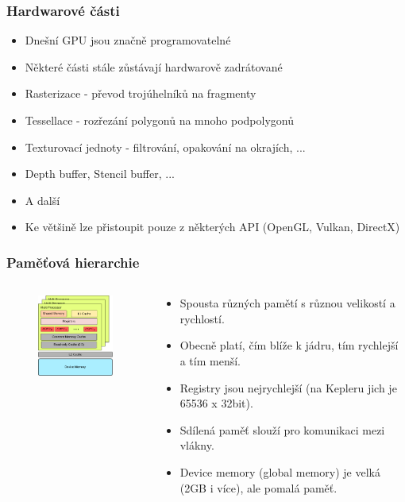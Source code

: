 \begin{frame}
\frametitle{Hardwarové části}
	\begin{itemize}
	\item Dnešní GPU jsou značně programovatelné
  \item Některé části stále zůstávají hardwarově zadrátované
  \item Rasterizace - převod trojúhelníků na fragmenty
  \item Tessellace - rozřezání polygonů na mnoho podpolygonů
  \item Texturovací jednoty - filtrování, opakování na okrajích, ...
  \item Depth buffer, Stencil buffer, ...
  \item A další
  \item Ke většině lze přistoupit pouze z některých API (OpenGL, Vulkan, DirectX)
	\end{itemize}
\end{frame}

\begin{frame}
  \frametitle{Paměťová hierarchie}
  \begin{columns}[T]
    \begin{column}{.48\textwidth}
      \begin{figure}[h]
        \includegraphics[width=5cm,keepaspectratio]{pics/gpu/memory_hierarchy}
      \end{figure}
    \end{column}
    \begin{column}{.48\textwidth}
      \begin{itemize}
        \item Spousta různých pamětí s různou velikostí a rychlostí.
        \item Obecně platí, čím blíže k jádru, tím rychlejší a tím menší.
        \item Registry jsou nejrychlejší (na Kepleru jich je 65536 x 32bit).
        \item Sdílená paměť slouží pro komunikaci mezi vlákny.
        \item Device memory (global memory) je velká (2GB i více), ale pomalá paměť.
      \end{itemize}
    \end{column}
  \end{columns}
\end{frame}

